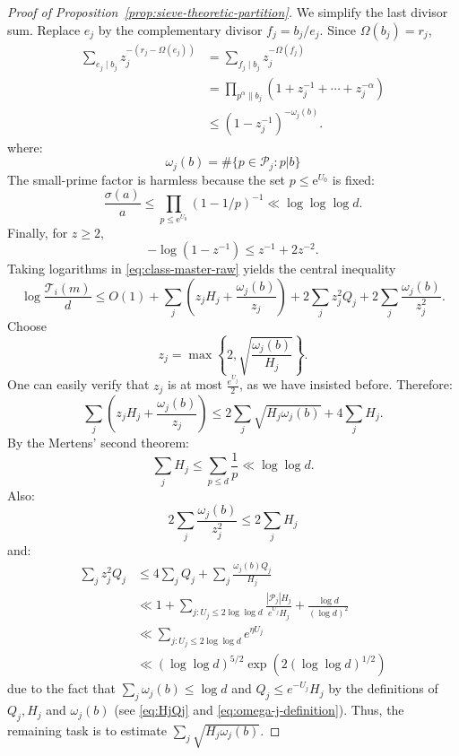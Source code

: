 \documentclass[11pt]{amsart}
\theoremstyle{remark}
\begin{document}
\begin{proof}[Proof of Proposition~\ref{prop:sieve-theoretic-partition}]
We simplify the last divisor sum.  Replace $e_j$ by the complementary divisor
$f_j=b_j/e_j$.  Since $\Omega(b_j)=r_j$,
\begin{align*}
 \sum_{e_j\mid b_j}z_j^{-(r_j-\Omega(e_j))}
 &=\sum_{f_j\mid b_j}z_j^{-\Omega(f_j)}\\
 &=\prod_{p^\alpha\parallel b_j}
   (1+z_j^{-1}+\cdots+z_j^{-\alpha})\\
 &\le (1-z_j^{-1})^{-\omega_j(b)}.
\end{align*}
where:
\begin{equation} \label{eq:omega-j-definition}
  \omega_j(b) = \# \{ p \in \mathcal{P}_j : p | b \}
\end{equation}
The small-prime factor is harmless because the set $p\le\mathrm e^{U_0}$ is fixed:
\[
 \frac{\sigma(a)}a
 \le\prod_{p\le\mathrm e^{U_0}}(1-1/p)^{-1} \ll \log \log \log d.
\]
Finally, for $z\ge2$,
\[
 -\log(1-z^{-1})\le z^{-1}+2z^{-2}.
\]
Taking logarithms in \eqref{eq:class-master-raw} yields the central inequality
\begin{equation}\label{eq:central-inequality}
 \log\frac{\mathcal T_i(m)}d
 \le O(1)
 +\sum_j\left(z_jH_j+\frac{\omega_j(b)}{z_j}\right)
 +2\sum_jz_j^2Q_j
 +2\sum_j\frac{\omega_j(b)}{z_j^2}.
\end{equation}
Choose
\begin{equation}
 z_j=\max\left\{2,\sqrt{\frac{\omega_j(b)}{H_j}}\right\}.
\end{equation}
One can easily verify that $z_j$ is at most $\frac{e^{U_j}}{2}$, as we have insisted before.
Therefore:
\begin{equation}\label{eq:main-reduction}
 \sum_j\left(z_jH_j+\frac{\omega_j(b)}{z_j}\right)
 \le 2\sum_j\sqrt{H_j\omega_j(b)}+4\sum_jH_j.
\end{equation}
By the Mertens' second theorem:
\[
 \sum_jH_j\le\sum_{p\le d}\frac1p \ll \log \log d.
\]
Also:
\begin{equation}
  2 \sum_j \frac{\omega_j(b)}{z_j^2} \leq 2 \sum_j H_j
\end{equation}
and:
\begin{equation}
  \begin{aligned}
    \sum_{j} z_j^2 Q_j
    &\leq 4\sum_j Q_j+\sum_j \frac{\omega_j(b) Q_j}{H_j}\\
    &\ll 1+\sum_{j : U_j \leq 2 \log \log d}
      \frac{|\mathcal{P}_j| H_j}{e^{U_j} H_j}
      + \frac{\log d}{(\log d)^2}\\
    &\ll \sum_{j : U_j \leq 2 \log \log d} e^{\eta U_j}\\
    &\ll (\log \log d)^{5/2}
      \exp(2 (\log \log d)^{1/2})
  \end{aligned}
\end{equation}
due to the fact that $\sum_j \omega_j(b) \leq \log d$ and $Q_j \leq e^{-U_j} H_j$ by the definitions of $Q_j, H_j$ and $\omega_j(b)$ (see \eqref{eq:HjQj} and \eqref{eq:omega-j-definition}).
Thus, the remaining task is to estimate $\sum_j\sqrt{H_j\omega_j(b)}$.


\end{proof}
\end{document}
